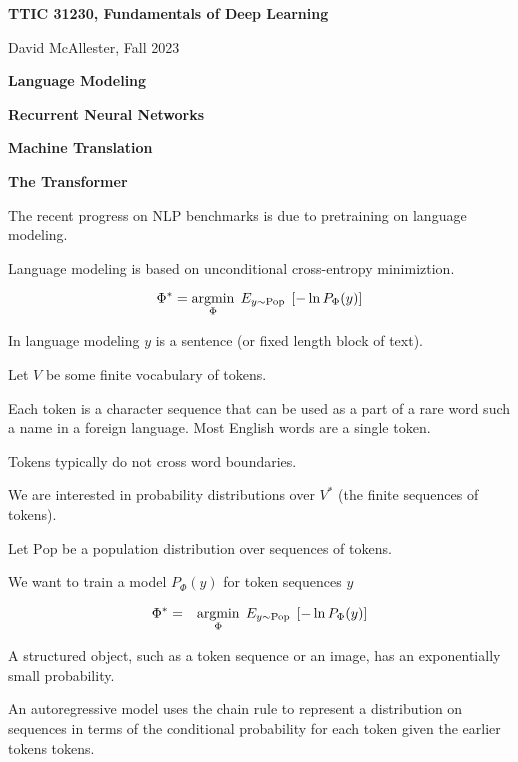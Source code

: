 




{\Huge

  \centerline{\bf TTIC 31230, Fundamentals of Deep Learning}
  \bigskip
  \centerline{David McAllester, Fall 2023}
  \vfill
  \vfill
  \centerline{\bf Language Modeling}
  \vfill
  \centerline{\bf Recurrent Neural Networks}
  \vfill
  \centerline{\bf Machine Translation}
  \vfill
  \centerline{\bf The Transformer}
  \vfill
  \vfill


The recent progress on NLP benchmarks is due to pretraining on language modeling.

\vfill
Language modeling is based on unconditional cross-entropy minimiztion.

\vfill
$$\Phi^* = \operatorname*{argmin}_\Phi \;E_{y \sim \mathrm{Pop}}\;\left[-\ln P_\Phi(y)\right]$$

\vfill
In language modeling $y$ is a sentence (or fixed length block of text).


Let $V$ be some finite vocabulary of tokens.

\vfill
Each token is a character sequence that
can be used as a part of a rare word such a name in a foreign language.  Most English words
are a single token.

\vfill
Tokens typically do not cross word boundaries.

\vfill
We are interested in probability distributions over $V^*$ (the finite sequences of tokens).


Let $\mathrm{Pop}$ be a population distribution over sequences of tokens.

\vfill
We want to train a model $P_\Phi(y)$ for token sequences $y$

\begin{eqnarray*}
\Phi^* & = & \operatorname*{argmin}_\Phi \; E_{y \sim \mathrm{Pop}}\;\left[-\ln P_\Phi(y)\right]
\end{eqnarray*}

A structured object, such as a token sequence or an image, has an exponentially small probability.


An autoregressive model uses the chain rule to represent a distribution on sequences in terms of the conditional probability for each token given  the earlier tokens
tokens.

}
